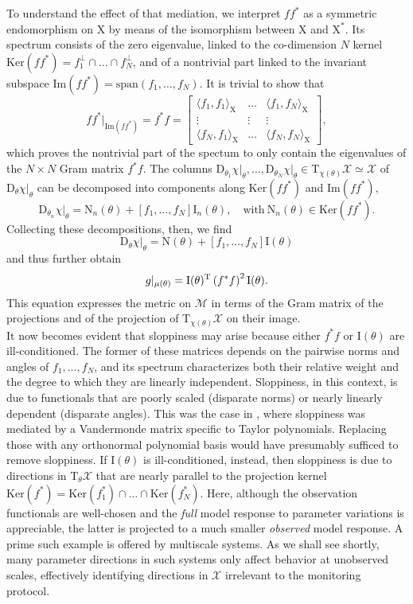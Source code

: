 \documentclass{article}
\newcommand{\D}{\mathrm{D}}
\newcommand{\p}{\theta}
\newcommand{\fmr}{\chi}
\newcommand{\fmm}{\mathcal{X}}
\newcommand{\omr}{\mu}
\newcommand{\omm}{\mathcal{M}}
\newcommand{\fms}{\mathrm{X}}
\newcommand{\be}{\begin{equation}}
\newcommand{\ee}{\end{equation}}
\begin{document}
To understand the effect of that mediation,
we interpret $f f^*$ as a symmetric endomorphism on $\fms$
by means of the isomorphism between $\fms$ and $\fms^*$.
Its spectrum consists of the zero eigenvalue,
linked to the co-dimension $N$ kernel
$\mathrm{Ker}(f f^*) = f_1^\perp \cap \ldots \cap f_N^\perp$,
and of a nontrivial part linked to the invariant subspace
$\mathrm{Im}(f f^*) = \mathrm{span}(f_1,\ldots,f_N)$.
It is trivial to show that
%
\[
 f f^*\vert_{\mathrm{Im}(f f^*)}
=
 f^* f
=
\left[\begin{array}{ccc}
 \langle f_1,f_1\rangle_\fms
&
 \ldots
&
 \langle f_1,f_N\rangle_\fms
\\
 \vdots
&
 \vdots
&
 \vdots
\\
 \langle f_N,f_1\rangle_\fms
&
 \ldots
&
 \langle f_N,f_N\rangle_\fms
\end{array}\right] ,
\]
%
which proves the nontrivial part of the spectum to only contain
the eigenvalues of the $N \times N$ Gram matrix $f^* f$.
The columns
$\D_{\p_1}\fmr\vert_\p , \ldots , \D_{\p_N}\fmr\vert_\p
\in \mathrm{T}_{\fmr(\p)}\fmm \simeq \fmm$
of $\D_\p\fmr\vert_\p$ can be decomposed into components along
$\mathrm{Ker}(f f^*)$ and $\mathrm{Im}(f f^*)$,
%
\[
 \D_{\p_n}\fmr\vert_\p
=
 \mathrm{N}_n(\p)
+
 \left[ f_1 , \ldots , f_N \right]
 \mathrm{I}_n(\p) ,
\quad \mbox{with} \
 \mathrm{N}_n(\p) \in \mathrm{Ker}(f f^*) .
\]
%
Collecting these decompositions, then, we find
%
\[
 \D_\p\fmr\vert_\p
=
 \mathrm{N}(\p)
+
 \left[ f_1 , \ldots , f_N \right]
 \mathrm{I}(\p)
\]
%
and thus further obtain
%
\be
 g\vert_{\omr(\p)}
=
 \mathrm{I}(\p)^{\rm T}
\left(
 f^* f
\right)^2
 \mathrm{I}(\p) .
\label{g-ito-proj}
\ee
%
This equation expresses the metric on $\omm$
in terms of the Gram matrix of the projections
and of the projection of $\mathrm{T}_{\fmr(\p)}\fmm$ on their image.\\

It now becomes evident that sloppiness may arise
because either $f^* f$ or $\mathrm{I}(\p)$ are ill-conditioned.
The former of these matrices depends on
the pairwise norms and angles of $f_1,\ldots,f_N$,
and its spectrum characterizes both their relative weight
and the degree to which they are linearly independent.
Sloppiness, in this context, is due to functionals
that are poorly scaled (disparate norms)
or nearly linearly dependent (disparate angles).
This was the case in \cite{WCGBMBES06},
where sloppiness was mediated by a Vandermonde matrix
specific to Taylor polynomials.
Replacing those with any orthonormal polynomial basis
would have presumably sufficed to remove sloppiness.
If $\mathrm{I}(\p)$ is ill-conditioned, instead,
then sloppiness is due to directions in $\mathrm{T}_\p\fmm$
that are nearly parallel to the projection kernel
$\mathrm{Ker}(f^*)
=
\mathrm{Ker}(f^*_1) \cap \ldots \cap \mathrm{Ker}(f^*_N)$.
Here, although the observation functionals are well-chosen
and the \emph{full} model response to parameter variations is appreciable,
the latter is projected to a much smaller \emph{observed} model response.
A prime such example is offered by multiscale systems.
As we shall see shortly,
many parameter directions in such systems
only affect behavior at unobserved scales,
effectively identifying directions in $\fmm$
irrelevant to the monitoring protocol.\\
\end{document}
